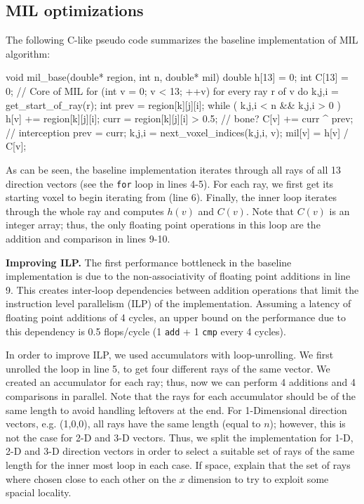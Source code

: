 \documentclass[letterpaper]{article}
\newcommand{\mypar}[1]{{\bf #1.}}
\begin{document}
\subsection{MIL optimizations}
The following C-like pseudo code summarizes the baseline implementation of MIL algorithm:

\begin{ccode}[caption={My Caption},captionpos=b]
void mil_base(double* region, int n, double* mil){
  double h[13] = 0; int C[13] = 0;
  // Core of MIL
  for (int v = 0; v < 13; ++v)
    for every ray r of v  do
      {k,j,i} = get_start_of_ray(r);
      int prev = region[k][j][i];
      while ( {k,j,i} < n && {k,j,i} > 0 )
        h[v] += region[k][j][i];
        curr = region[k][j][i] > 0.5; // bone?
        C[v] += curr ^ prev; // interception
        prev = curr;
        {k,j,i} = next_voxel_indices({k,j,i}, v);
    mil[v] = h[v] / C[v];
 }
\end{ccode}
As can be seen, the baseline implementation iterates through all rays of all 13 direction vectors (see the \texttt{for} loop in lines 4-5). For each ray, we first get its starting voxel to begin iterating from (line 6). Finally, the inner loop iterates through the whole ray and computes $h(v)$ and $C(v)$. Note that $C(v)$ is an integer array; thus, the only floating point operations in this loop are the addition and comparison in lines 9-10.

\mypar{Improving ILP}
The first performance bottleneck in the baseline implementation is due to the non-associativity of floating point additions in line 9. This creates inter-loop dependencies between addition operations that limit the instruction level parallelism (ILP) of the implementation. Assuming a latency of floating point additions of 4 cycles, an upper bound on the performance due to this dependency is 0.5 flops/cycle (1 \texttt{add} + 1 \texttt{cmp} every 4 cycles).

In order to improve ILP, we used accumulators with loop-unrolling. We first unrolled the loop in line 5, to get four different rays of the same vector. We created an accumulator for each ray; thus, now we can perform 4 additions and 4 comparisons in parallel. Note that the rays for each accumulator should be of the same length to avoid handling leftovers at the end. For 1-Dimensional direction vectors, e.g. (1,0,0), all rays have the same length (equal to $n$); however, this is not the case for 2-D and 3-D vectors. Thus, we split the implementation for 1-D, 2-D and 3-D direction vectors in order to select a suitable set of rays of the same length for the inner most loop in each case.
{\color{red} If space, explain that the set of rays where chosen close to each other on the $x$ dimension to try to exploit some spacial locality.}
\end{document}
